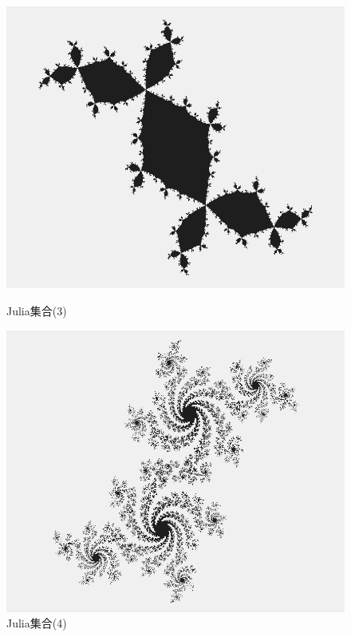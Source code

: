 \documentclass[dvipdfmx]{jsarticle}
\theoremstyle{definition}
\begin{document}
\vspace{\baselineskip}

\begin{figure}[ht]
\begin{minipage}{0.5\hsize}
    \begin{center}
        \includegraphics[scale=0.21]{figure/julia_set3.png}
    \end{center}
    \caption{Julia集合(3)}
\end{minipage}
\begin{minipage}{0.49\hsize}
    \begin{center}
        \includegraphics[scale=0.21]{figure/julia_set4.png}
    \end{center}
    \caption{Julia集合(4)}
\end{minipage}
\end{figure}
\end{document}
